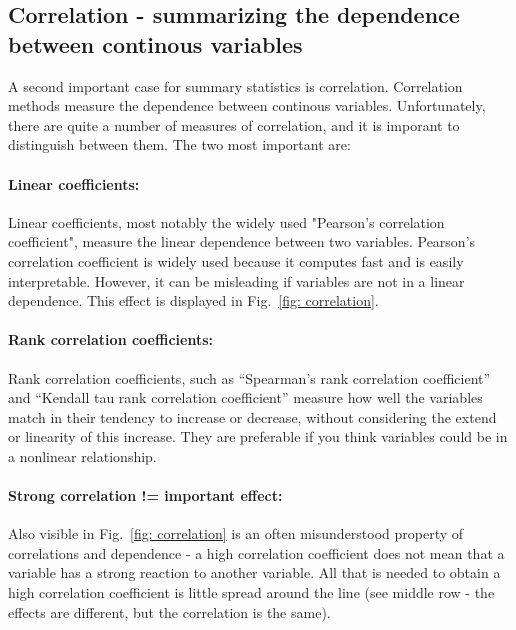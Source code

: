 \documentclass[a4paper,twoside]{tufte-book}\usepackage[]{graphicx}\usepackage[]{color}
\begin{document}
{\subsection{Correlation - summarizing the dependence between continous variables}

A second important case for summary statistics is correlation. Correlation methods measure the dependence between continous variables. Unfortunately, there are quite a number of measures of correlation, and it is imporant to distinguish between them. The two most important are:

\paragraph{Linear coefficients:}Linear coefficients, most notably the widely used "Pearson's correlation coefficient", measure the linear dependence between two variables. Pearson's correlation coefficient is widely used because it computes fast and is easily interpretable. However, it can be misleading if variables are not in a linear dependence. This effect is displayed in Fig.~\ref{fig: correlation}.

\paragraph{Rank correlation coefficients:} Rank correlation coefficients, such as ``Spearman's rank correlation coefficient'' and ``Kendall tau rank correlation coefficient'' measure how well the variables match in their tendency to increase or decrease, without considering the extend or linearity of this increase. They are preferable if you think variables could be in a nonlinear relationship.

\paragraph{Strong correlation != important effect:} Also visible in Fig.~\ref{fig: correlation} is an often misunderstood property of correlations and dependence - a high correlation coefficient does not mean that a variable has a strong reaction to another variable. All that is needed to obtain a high correlation coefficient is little spread around the line (see middle row - the effects are different, but the correlation is the same). 


}
\end{document}
